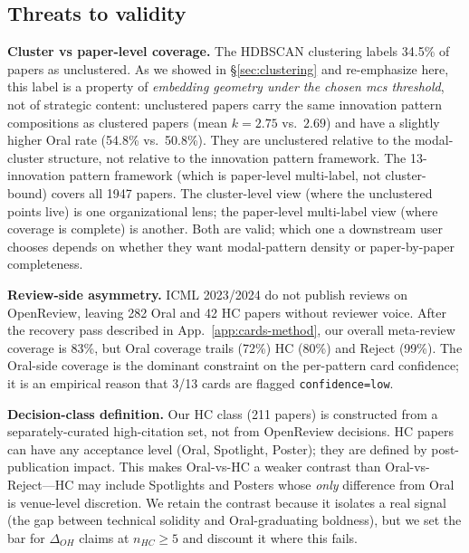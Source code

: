 \documentclass[10pt,a4paper]{article}
\begin{document}
\subsection{Threats to validity}

\textbf{Cluster vs paper-level coverage.} The HDBSCAN clustering labels 34.5\% of papers as unclustered. As we showed in \S\ref{sec:clustering} and re-emphasize here, this label is a property of \emph{embedding geometry under the chosen mcs threshold}, not of strategic content: unclustered papers carry the same innovation pattern compositions as clustered papers (mean $k = 2.75$ vs.\ $2.69$) and have a slightly higher Oral rate (54.8\% vs.\ 50.8\%). They are unclustered relative to the modal-cluster structure, not relative to the innovation pattern framework. The 13-innovation pattern framework (which is paper-level multi-label, not cluster-bound) covers all 1947 papers. The cluster-level view (where the unclustered points live) is one organizational lens; the paper-level multi-label view (where coverage is complete) is another. Both are valid; which one a downstream user chooses depends on whether they want modal-pattern density or paper-by-paper completeness.

\textbf{Review-side asymmetry.} ICML 2023/2024 do not publish reviews on OpenReview, leaving 282 Oral and 42 HC papers without reviewer voice. After the recovery pass described in App.~\ref{app:cards-method}, our overall meta-review coverage is 83\%, but Oral coverage trails (72\%) HC (80\%) and Reject (99\%). The Oral-side coverage is the dominant constraint on the per-pattern card confidence; it is an empirical reason that 3/13 cards are flagged \texttt{confidence=low}.

\textbf{Decision-class definition.} Our HC class (211 papers) is constructed from a separately-curated high-citation set, not from OpenReview decisions. HC papers can have any acceptance level (Oral, Spotlight, Poster); they are defined by post-publication impact. This makes Oral-vs-HC a weaker contrast than Oral-vs-Reject---HC may include Spotlights and Posters whose \emph{only} difference from Oral is venue-level discretion. We retain the contrast because it isolates a real signal (the gap between technical solidity and Oral-graduating boldness), but we set the bar for $\Delta_{OH}$ claims at $n_{HC} \geq 5$ and discount it where this fails.
\end{document}
